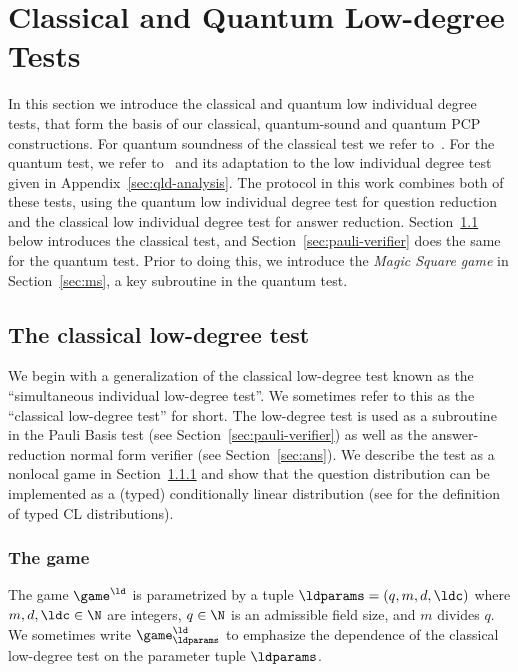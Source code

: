 \section{Classical and Quantum Low-degree Tests}
\label{sec:ldt}

In this section we introduce the classical and quantum low individual degree tests, that form the basis of our classical, quantum-sound and quantum PCP constructions. For quantum soundness of the classical test we refer to~\cite{ML20}. For the quantum test, we refer to~\cite{natarajan2018low} and its adaptation to the low individual degree test given in Appendix~\ref{sec:qld-analysis}. 
The protocol in this work combines both of these tests, using the quantum
low individual degree test for question reduction and the classical low individual degree test for
answer reduction.
Section~\ref{sec:ld-verifier} below introduces the classical test,
and Section~\ref{sec:pauli-verifier} does the same for the quantum 
test.
Prior to doing this, we introduce the \emph{Magic Square game} in
Section~\ref{sec:ms}, a key subroutine in the quantum test.


\subsection{The classical low-degree test}
\label{sec:ld-verifier}

We begin with a generalization of the classical low-degree test known as the
``simultaneous individual low-degree test''.
We sometimes refer to this as the ``classical low-degree test'' for short.
The low-degree test is used as a subroutine in the Pauli Basis test (see
Section~\ref{sec:pauli-verifier}) as well as the answer-reduction normal form
verifier (see Section~\ref{sec:ans}).
We describe the test as a nonlocal game in Section~\ref{sec:ld-game} and show
that the question distribution can be implemented as a (typed) conditionally
linear distribution (see  for the definition of typed CL
distributions).


\subsubsection{The game}
\label{sec:ld-game}

The game $\game^\ld$ is parametrized by a tuple $\ldparams = (q, m, d, \ldc)$
where $m, d, \ldc \in \N$ are integers, $q \in \N$ is an admissible field size,
and $m$ divides $q$.
We sometimes write $\game^\ld_\ldparams$ to emphasize the dependence of the
classical low-degree test on the parameter tuple $\ldparams$.

